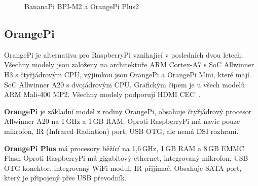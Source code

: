	
	\begin{figure}[!ht]
    \centering
			\hspace*{5mm}
			\caption{BananaPi BPI-M2 a OrangePi Plus2}
\end{figure}
	
	

	\subsection{OrangePi}
	OrangePi je alternativa pro RaspberryPi vznikající v posledních dvou letech. Všechny modely jsou založeny na architektuře ARM Cortex-A7 s SoC Allwinner H3 s čtyřjádrovým CPU, výjimkou jsou OrangePi a OrangePi Mini, které mají SoC Allwinner A20 s dvojádrovým CPU. Grafickým čipem je u všech modelů ARM Mali-400 MP2. Všechny modely podporují HDMI CEC~\cite{OrangePi}.

		\textbf{OrangePi} je základní model z rodiny OrangePi, obsahuje čtyřjádrový procesor Allwinner A20 na 1\,GHz a 1\,GB RAM. Oproti RaspberryPi má navíc pouze mikrofon, IR (Infrared Radiation) port, USB OTG, ale nemá DSI rozhraní.
		
		\textbf{OrangePi Plus } má procesory běžící na 1,6\,GHz, 1\,GB RAM a 8\,GB EMMC Flash Oproti  RaspberryPi má gigabitový ethernet, integrovaný mikrofon, USB-OTG konektor, integrovaný WiFi modul, IR přijímač. Obsahuje SATA port, který je připojený přes USB převodník.
		
